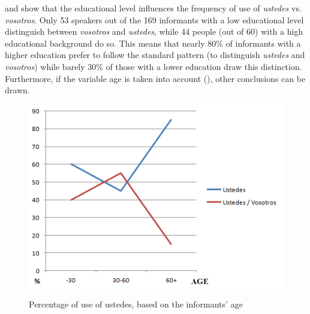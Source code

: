 \documentclass[output=paper]{LSP/langsci}
\begin{document}
 and  show that the educational level influences the frequency of use of \textit{ustedes} vs. \textit{vosotros}. Only 53 speakers out of the 169 informants with a low educational level distinguish between \textit{vosotros} and \textit{ustedes}, while 44 people (out of 60) with a high educational background do so. This means that nearly 80\% of informants with a higher education prefer to follow the standard pattern (to distinguish \textit{ustedes} and \textit{vosotros}) while barely 30\% of those with a lower education draw this distinction. Furthermore, if the variable age is taken into account (), other conclusions can be drawn.

\begin{figure}
\includegraphics[width=\textwidth]{illustrations/lara_fig6}
\label{fig:6}
\caption{Percentage of use of ustedes, based on the informants' age}
\end{figure}
\end{document}
